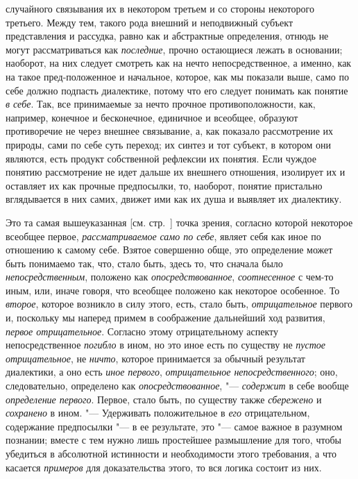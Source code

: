 {{случайного связывания их в некотором третьем и со стороны некоторого
третьего. Между тем, такого рода внешний и неподвижный субъект
представления и рассудка, равно как и абстрактные определения, отнюдь не
могут рассматриваться как {\em последние}, прочно
остающиеся лежать в основании; наоборот, на них следует
смотреть как на нечто непосредственное, а именно, как на такое
пред-положенное и начальное, которое, как мы показали выше, само по себе
должно подпасть диалектике, потому что его следует понимать как понятие
{\em в себе}. Так, все
принимаемые за нечто прочное противоположности, как, например, конечное и
бесконечное, единичное и всеобщее, образуют противоречие не через внешнее
связывание, а, как показало рассмотрение их природы, сами по себе суть
переход; их синтез и тот субъект, в котором они являются, есть продукт
собственной рефлексии их понятия. Если чуждое понятию рассмотрение не идет
дальше их внешнего отношения, изолирует их и оставляет их как прочные
предпосылки, то, наоборот, понятие пристально вглядывается в них самих,
движет ими как их душа и выявляет их диалектику.

Это та самая вышеуказанная [см. стр.~\pageref{bkm:bmpg224a}]
точка зрения, согласно которой некоторое всеобщее первое,
{\em рассматриваемое} {\em само по себе}, являет
себя как иное по отношению к самому себе. Взятое совершенно обще, это
определение может быть понимаемо так, что, стало быть, здесь то, что
сначала было {\em непосредственным},
положено как {\em опосредствованное}, {\em соотнесенное} с
чем-то иным, или, иначе говоря, что всеобщее положено как некоторое
особенное. То {\em второе},
которое возникло в силу этого, есть, стало быть, {\em отрицательное}
первого и, поскольку мы наперед примем в соображение
дальнейший ход развития, {\em первое
отрицательное}. Согласно этому отрицательному аспекту
непосредственное {\em погибло}
в ином, но это иное есть по существу не
{\em пустое отрицательное}, не {\em ничто},
которое принимается за обычный результат диалектики, а оно
есть {\em иное первого},
{\em отрицательное непосредственного}; оно, следовательно, определено как
{\em опосредствованное}, "--- {\em содержит} в себе
вообще {\em определение первого}. Первое, стало быть, по существу также
{\em сбережено} и {\em сохранено} в ином. "--- Удерживать положительное в
{\em его} отрицательном, содержание предпосылки "--- в ее
результате,
это "--- самое важное в разумном познании; вместе
с тем нужно лишь простейшее размышление для того, чтобы убедиться в
абсолютной истинности и необходимости этого требования, а что касается
{\em примеров} для доказательства этого, то вся логика состоит из них.

}}
